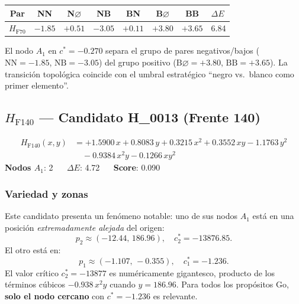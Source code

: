 \documentclass[11pt,a4paper]{article}
\newcommand{\dE}{\Delta E}
\begin{document}
\begin{center}
\begin{tabular}{ccccccc}
  \toprule
  Par & NN & N$\varnothing$ & NB & BN & B$\varnothing$ & BB & $\dE$ \\
  \midrule
  $H_{\text{F70}}$ & $-1.85$ & $+0.51$ & $-3.05$ & $+0.11$ & $+3.80$ & $+3.65$ & 6.84 \\
  \bottomrule
\end{tabular}
\end{center}

El nodo $A_1$ en $c^*=-0.270$ separa el grupo de pares
negativos/bajos ($\text{NN}=-1.85$, $\text{NB}=-3.05$) del grupo positivo
($\text{B}\varnothing=+3.80$, $\text{BB}=+3.65$). La transición topológica
coincide con el umbral estratégico ``negro vs.\ blanco como primer elemento''.

\subsection{\texorpdfstring{$H_{\text{F140}}$}{H\_F140} --- Candidato H\_0013 (Frente 140)}

\begin{tcolorbox}[hambox,title={$H_{\text{F140}}$ (H\_0013, \textcolor{cFrontLow}{Frente 140}) $\cdot$
  $H_1$-max = 0.000 $\cdot$ Rob = 0.000}]
\begin{align*}
  H_{\text{F140}}(x,y) &=
    +1.5900\,x + 0.8083\,y
    + 0.3215\,x^2 + 0.3552\,xy - 1.1763\,y^2 \\
  &\quad - 0.9384\,x^2y - 0.1266\,xy^2
\end{align*}
\textbf{Nodos $A_1$}: 2 $\quad$
\textbf{$\dE$}: 4.72 $\quad$
\textbf{Score}: 0.090
\end{tcolorbox}

\subsubsection*{Variedad y zonas}

Este candidato presenta un fenómeno notable: uno de sus nodos $A_1$ está
en una posición \emph{extremadamente alejada} del origen:
\[
  p_2\approx(-12.44,\,186.96),\quad c^*_2=-13876.85.
\]
El otro está en:
\[
  p_1\approx(-1.107,\,-0.355),\quad c^*_1=-1.236.
\]
El valor crítico $c^*_2=-13877$ es numéricamente gigantesco, producto de
los términos cúbicos $-0.938\,x^2y$ cuando $y=186.96$. Para todos los
propósitos Go, \textbf{solo el nodo cercano} con $c^*=-1.236$ es relevante.
\end{document}
